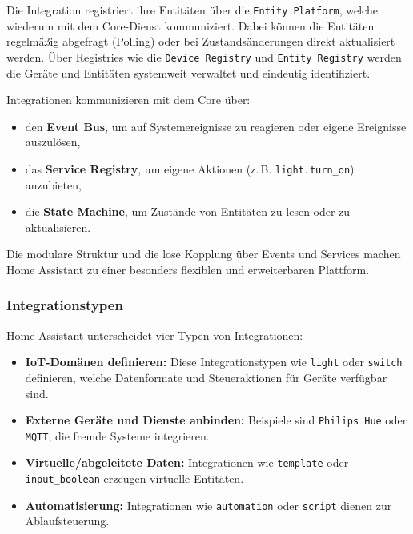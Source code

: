 Die Integration registriert ihre Entitäten über die \texttt{Entity Platform}, welche wiederum mit dem Core-Dienst kommuniziert. Dabei können die Entitäten regelmäßig abgefragt (Polling) oder bei Zustandsänderungen direkt aktualisiert werden. Über Registries wie die \texttt{Device Registry} und \texttt{Entity Registry} werden die Geräte und Entitäten systemweit verwaltet und eindeutig identifiziert.

Integrationen kommunizieren mit dem Core über:

\begin{itemize}
    \item den \textbf{Event Bus}, um auf Systemereignisse zu reagieren oder eigene Ereignisse auszulösen,\\
    \item das \textbf{Service Registry}, um eigene Aktionen (z.\,B. \texttt{light.turn\_on}) anzubieten,\\
    \item die \textbf{State Machine}, um Zustände von Entitäten zu lesen oder zu aktualisieren.
\end{itemize}

Die modulare Struktur und die lose Kopplung über Events und Services machen Home Assistant zu einer besonders flexiblen und erweiterbaren Plattform.

\subsubsection{Integrationstypen}

Home Assistant unterscheidet vier Typen von Integrationen:

\begin{itemize}
    \item \textbf{IoT-Domänen definieren:} Diese Integrationstypen wie \texttt{light} oder \texttt{switch} definieren, welche Datenformate und Steueraktionen für Geräte verfügbar sind.\\
    \item \textbf{Externe Geräte und Dienste anbinden:} Beispiele sind \texttt{Philips Hue} oder \texttt{MQTT}, die fremde Systeme integrieren.\\
    \item \textbf{Virtuelle/abgeleitete Daten:} Integrationen wie \texttt{template} oder \texttt{input\_boolean} erzeugen virtuelle Entitäten.\\
    \item \textbf{Automatisierung:} Integrationen wie \texttt{automation} oder \texttt{script} dienen zur Ablaufsteuerung.
\end{itemize}



